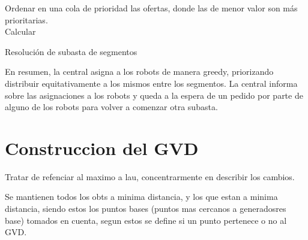 


\begin{algorithm}[H]
\SetAlgoLined
Ordenar en una cola de prioridad las ofertas, donde las de menor valor son más prioritarias.\\
Calcular\\ %
 \caption{Resolución de subasta de segmentos}
 \label{alg:resolucionsubastasegmentos}
\end{algorithm}

En resumen, la central asigna a los robots de manera   greedy, priorizando
distribuir equitativamente a los mismos entre los segmentos. La central informa
sobre las asignaciones a los robots y queda a la espera de un pedido por parte
de alguno de los robots para volver a comenzar otra subasta.


\section{Construccion del GVD}\label{sec:MiConstGVD}

Tratar de refenciar al maximo a lau, concentrarmente en describir los cambios.

Se mantienen todos los obts a minima distancia, y los que  estan a
minima distancia, siendo estos los puntos bases (puntos mas cercanos a
generadosres base) tomados en cuenta, segun estos se define si un punto pertenece o no al GVD.

